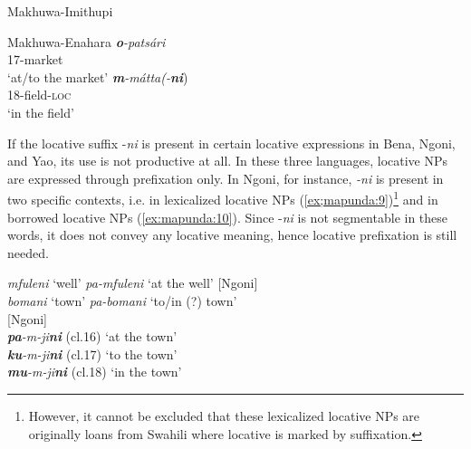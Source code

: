 \documentclass[output=paper ]{langscibook}
\begin{document}
\ea 
\label{ex:mapunda:7}Makhuwa-Imithupi
    \z

\ex
\label{ex:mapunda:8}Makhuwa-Enahara \citep[53--54]{Guérois2016}
    \ea\label{ex:mapunda:8a} \gll  \textbf{\textit{o}}\textit{{}-patsári} \\         
                                    17-market \\        
                            \glt ‘at/to the market’        
    \ex\label{ex:mapunda:8b} \gll \textbf{\textit{m}}\textit{{}-mátta(-}\textbf{\textit{ni}})\\
                                    18-field-\textsc{loc}\\
                            \glt ‘in the field’
    \z
\z

If the locative suffix -\textit{ni} is present in certain locative expressions in Bena, Ngoni, and Yao, its use is not productive at all. In these three languages, locative NPs are expressed through prefixation only. In Ngoni, for instance, \textit{-ni} is present in two specific contexts, i.e. in lexicalized locative NPs (\ref{ex;mapunda:9})\footnote{However,
 it cannot be excluded that these lexicalized locative NPs are originally loans from Swahili where locative is marked by suffixation.}
and in borrowed locative NPs (\ref{ex:mapunda:10}). Since -\textit{ni} is not segmentable in these words, it does not convey any locative meaning, hence locative prefixation is still needed.



\ea\label{ex;mapunda:9} 
\gll \textit{mfuleni}   ‘well’     \textit{pa-mfuleni}   {‘at the well’}     \hspace{3.5cm}[Ngoni]\\ 
{\textit{bomani}} {‘town’} {\textit{pa-bomani}} {‘to/in (?) town’}\\



\ex\label{ex:mapunda:10}
 {}         \hspace{3.3cm}[Ngoni]\\
    {{\textbf{\textit{pa}}}{\textit{{}-m-ji}}{\textbf{\textit{ni}}} (cl.16)}     {‘at the town’}\\ 
    {{\textbf{\textit{ku}}}{\textit{{}-m-ji}}{\textbf{\textit{ni}}} (cl.17)}     {‘to the town’}\\
    {{\textbf{\textit{mu}}}{\textit{{}-m-ji}}{\textbf{\textit{ni}}} (cl.18)}     {‘in the town’}\\
\z
\end{document}
